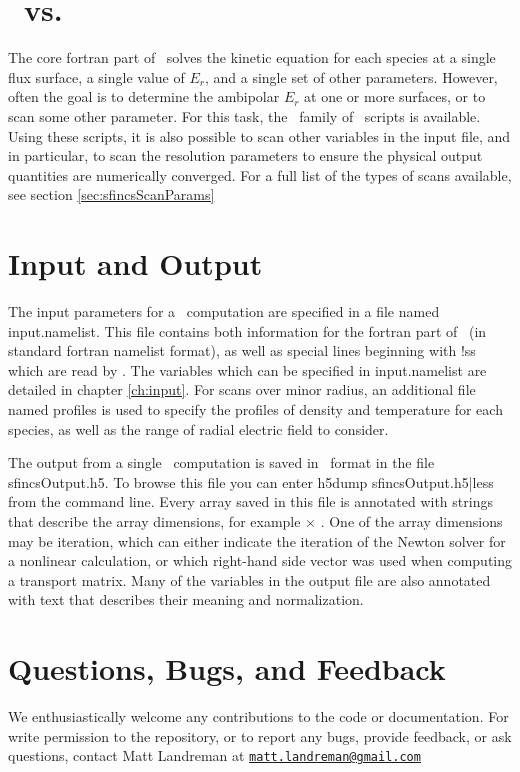 \section{\sfincs~vs. \sfincsScan}
The core fortran part of \sfincs~solves the kinetic equation for each species
at a single flux surface, a single value of $E_r$, and a single set of other parameters.
However, often the goal is to determine the ambipolar $E_r$ at one or more surfaces, or to scan some other parameter.
For this task, the \sfincsScan~family of \python~scripts is available.
Using these scripts, it is also possible to scan other variables in the input file,
and in particular, to scan the resolution parameters to ensure
the physical output quantities are numerically converged.
For a full list of the types of scans available, see section \ref{sec:sfincsScanParams}

\section{Input and Output}

The input parameters for a \sfincs~computation are specified in a file named {\ttfamily input.namelist}.
This file contains both information for the fortran part of \sfincs~(in standard fortran namelist format),
as well as special lines beginning with {\ttfamily !ss} which are read by \sfincsScan.
The variables which can be specified in {\ttfamily input.namelist} are detailed in chapter \ref{ch:input}.
For scans over minor radius, an additional file named {\ttfamily profiles} is used to specify the profiles of density and temperature
for each species, as well as the range of radial electric field to consider.

The output from a single \sfincs~computation is saved in \HDF~format in the file {\ttfamily sfincsOutput.h5}.
To browse this file you can enter {\ttfamily h5dump sfincsOutput.h5|less} from the command line.
Every array saved in this file is annotated with strings that describe the array dimensions,
for example \Ntheta$\times$ \Nzeta. One of the array dimensions may be {\ttfamily iteration},
which can either indicate the iteration of the Newton solver for a nonlinear calculation,
or which right-hand side vector was used when computing a transport matrix.
Many of the variables in the output file are also annotated with
text that describes their meaning and normalization.

\section{Questions, Bugs, and Feedback}

We enthusiastically welcome any contributions to the code or documentation.
For write permission to the repository, or to report any bugs, provide feedback, or ask questions, contact Matt Landreman at
\href{mailto:matt.landreman@gmail.com}{\nolinkurl{matt.landreman@gmail.com} }






